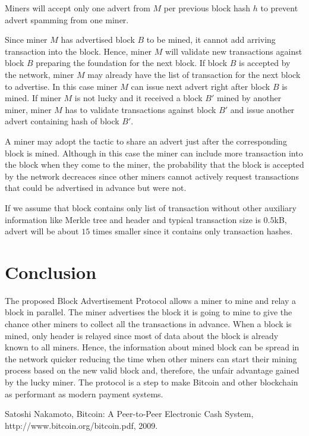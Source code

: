\documentclass[12pt]{elsarticle}
\begin{document}
Miners will accept only one advert from $M$ per previous block hash $h$ to prevent advert spamming from one miner.

Since miner $M$ has advertised block $B$ to be mined, it cannot add arriving transaction into the block. Hence, miner $M$ will validate new transactions against block $B$ preparing the foundation for the next block. If block $B$ is accepted by the network, miner $M$ may already have the list of transaction for the next block to advertise. In this case miner $M$ can issue next advert right after block $B$ is mined. If miner $M$ is not lucky and it received a block $B'$ mined by another miner, miner $M$ has to validate transactions against block $B'$ and issue another advert containing hash of block $B'$.

A miner may adopt the tactic to share an advert just after the corresponding block is mined. Although in this case the miner can include more transaction into the block when they come to the miner, the probability that the block is accepted by the network decreaces since other miners cannot actively request transactions that could be advertised in advance but were not.

If we assume that block contains only list of transaction without other auxiliary information like Merkle tree and header and typical transaction size is $0.5$kB, advert will be about $15$ times smaller since it contains only transaction hashes.

\section{Conclusion}
\label{conclusion}

The proposed Block Advertisement Protocol allows a miner to mine and relay a block in parallel. The miner advertises the block it is going to mine to give the chance other miners to collect all the transactions in advance. When a block is mined, only header is relayed since most of data about the block is already known to all miners. Hence, the information about mined block can be  spread in the network quicker reducing the time when other miners can start their mining process based on the new valid block and, therefore, the unfair advantage gained by the lucky miner. The protocol is a step to make Bitcoin and other blockchain as performant as modern payment systems.

\begin{thebibliography}{9}

  Satoshi Nakamoto,
  Bitcoin: A Peer-to-Peer Electronic Cash System,
  http://www.bitcoin.org/bitcoin.pdf,
  2009.

\end{thebibliography}
\end{document}
